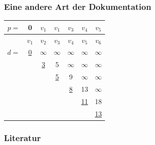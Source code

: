 \documentclass{beamer}
\begin{document}
\begin{frame} \frametitle{Eine andere Art der Dokumentation}
	\centering
	\begin{tabular}{r|cccccc}
		\hline
		$p =$ & 0 & $v_1$ & $v_1$ & \cancel{$v_2$} \alert{$v_3$} & \cancel{$v_3$} \alert{$v_4$} & \cancel{$v_4$} \alert{$v_5$} \\ \hline
		& $v_1$ & $v_2$ & $v_3$ & $v_4$ & $v_5$ & $v_6$ \\ \hline
		$d =$ & \uline{0} & $\infty$ & $\infty$ & $\infty$ & $\infty$ & $\infty$ \\
		&  & \uline{3} & 5 & $\infty$ & $\infty$ & $\infty$  \\
		&          &  & \uline{5}  & 9 & $\infty$ & $\infty$  \\
		&          &  &            & \uline{\alert{8}} & 13                 & $\infty$  \\
		&          &   &           &                   & \uline{\alert{11}} & 18  \\
		&          &   &           &                   &                    & \uline{\alert{13}} \\
		\hline
	\end{tabular}
\end{frame}

\begin{frame} \frametitle{Literatur}
	 
	
\end{frame}

\end{document}
